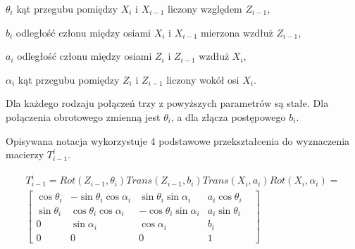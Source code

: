  \begin{eqwhere}[2cm]
 	\item [$\theta_{i}$] kąt przegubu pomiędzy $X_{i}$ i $X_{i-1}$ liczony względem $Z_{i-1}$,
 	\item [$b_{i}$] odległość członu między osiami $X_{i}$ i $X_{i-1}$ mierzona wzdłuż $Z_{i-1}$, 
 	\item [$a_{i}$] odległość członu między osiami $Z_{i}$ i $Z_{i-1}$ wzdłuż $X_{i}$,
 	\item [$\alpha_{i}$] kąt przegubu pomiędzy $Z_{i}$ i $Z_{i-1}$ liczony wokół osi $X_{i}$.
 \end{eqwhere}
 
 Dla każdego rodzaju połączeń trzy z powyższych parametrów są stałe. Dla połączenia obrotowego zmienną jest $\theta_{i}$, a dla złącza postępowego $b_{i}$. 
 
 Opisywana notacja wykorzystuje 4 podstawowe przekształcenia do wyznaczenia macierzy $T^{i}_{i-1}$. 
 

   \begin{eqnarray}
  T^{i}_{i-1} = Rot(Z_{i-1}, \theta_{i})Trans(Z_{i-1}, b_{i})Trans(X_{i}, a_{i})Rot(X_{i}, \alpha_{i}) = \nonumber \\
   \begin{bmatrix}
\cos\theta_{i} &
-\sin\theta_{i}\cos\alpha_{i} &
 \sin\theta_{i}\sin\alpha_{i} &
 a_{i}\cos\theta_{i} \\
 \sin\theta_{i} &
 \cos\theta_{i}\cos\alpha_{i} &
 -\cos\theta_{i}\sin\alpha_{i} &
 a_{i}\sin\theta_{i} \\
 0 &
 \sin\alpha_{i} &
 \cos\alpha_{i} &
 b_{i} \\
 0 &
 0 &
 0 &
 1 &
  \end{bmatrix}
  \end{eqnarray}
  
  
  
  
 